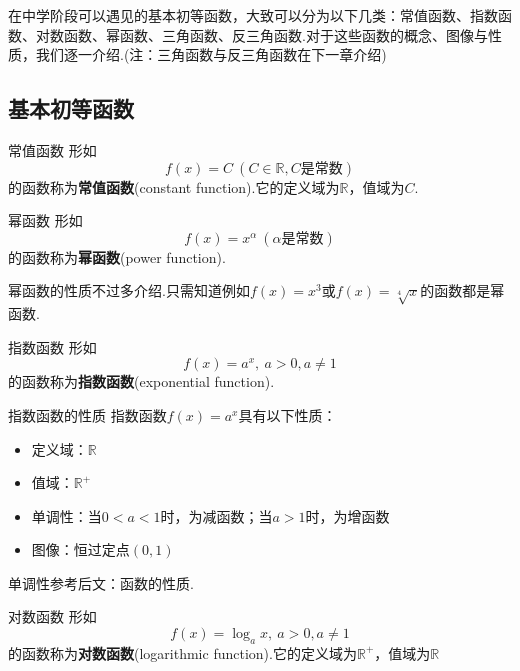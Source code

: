 \documentclass[lang=cn, zihao=4.5]{elegantbook}
\begin{document}
在中学阶段可以遇见的基本初等函数，大致可以分为以下几类：常值函数、指数函数、对数函数、幂函数、三角函数、反三角函数.对于这些函数的概念、图像与性质，我们逐一介绍.(注：三角函数与反三角函数在下一章介绍)

\subsection{基本初等函数}

\begin{definition}{常值函数}
    形如$$f(x)=C \ (C \in \mathbb{R}, C\textit{是常数})$$
    的函数称为\textbf{常值函数}(constant function).它的定义域为$\mathbb{R}$，值域为${C}$.
\end{definition}

\begin{definition}{幂函数}
    形如$$f(x)=x^{\alpha} \ (\alpha \text{是常数})$$
    的函数称为\textbf{幂函数}(power function).
\end{definition}

幂函数的性质不过多介绍.只需知道例如$f(x)=x^3$或$f(x)=\sqrt[4]{x}$的函数都是幂函数.

\begin{definition}{指数函数}
    形如$$f(x)=a^x, \ a>0 , a\neq 1$$
    的函数称为\textbf{指数函数}(exponential function).
\end{definition}

\begin{proposition}{指数函数的性质}
    指数函数$f(x)=a^x$具有以下性质：
    \begin{itemize}
        \item 定义域：$\mathbb{R}$
        \item 值域：$\mathbb{R}^+$
        \item 单调性：当$0<a<1$时，为减函数；当$a>1$时，为增函数
        \item 图像：恒过定点$(0,1)$
    \end{itemize}
\end{proposition}
\begin{remark}
    单调性参考后文：函数的性质.
\end{remark}


\begin{definition}{对数函数}
    形如$$f(x)=\log_{a}{x}, \ a>0,a \neq 1$$
    的函数称为\textbf{对数函数}(logarithmic function).它的定义域为$\mathbb{R}^{+}$，值域为$\mathbb{R}$
\end{definition}
\end{document}
